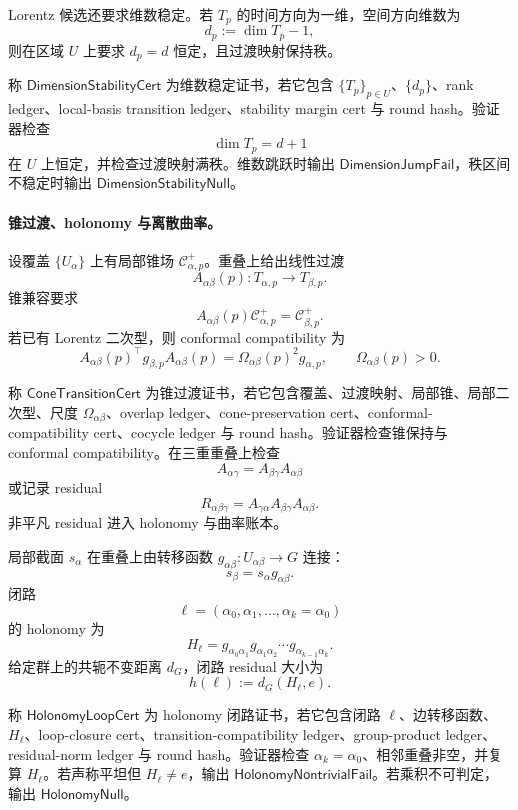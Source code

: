 Lorentz 候选还要求维数稳定。若 \(T_p\) 的时间方向为一维，空间方向维数为
\[
d_p:=\dim T_p-1,
\]
则在区域 \(U\) 上要求 \(d_p=d\) 恒定，且过渡映射保持秩。

\begin{definition}[维数稳定证书]\label{def:typed-address-biaxial-completion-dimension-stability-cert}
称 \(\mathsf{DimensionStabilityCert}\) 为维数稳定证书，若它包含 \(\{T_p\}_{p\in U}\)、\(\{d_p\}\)、rank ledger、local-basis transition ledger、stability margin cert 与 round hash。验证器检查
\[
\dim T_p=d+1
\]
在 \(U\) 上恒定，并检查过渡映射满秩。维数跳跃时输出 \(\mathsf{DimensionJumpFail}\)，秩区间不稳定时输出 \(\mathsf{DimensionStabilityNull}\)。
\end{definition}

\paragraph{锥过渡、holonomy 与离散曲率。}
设覆盖 \(\{U_\alpha\}\) 上有局部锥场 \(\mathcal C_{\alpha,p}^+\)。重叠上给出线性过渡
\[
A_{\alpha\beta}(p):T_{\alpha,p}\to T_{\beta,p}.
\]
锥兼容要求
\[
\boxed{
A_{\alpha\beta}(p)\mathcal C_{\alpha,p}^+
=
\mathcal C_{\beta,p}^+.
}
\]
若已有 Lorentz 二次型，则 conformal compatibility 为
\[
\boxed{
A_{\alpha\beta}(p)^\top g_{\beta,p}A_{\alpha\beta}(p)
=
\Omega_{\alpha\beta}(p)^2g_{\alpha,p},
\qquad
\Omega_{\alpha\beta}(p)>0.
}
\]

\begin{definition}[锥过渡证书]\label{def:typed-address-biaxial-completion-cone-transition-cert}
称 \(\mathsf{ConeTransitionCert}\) 为锥过渡证书，若它包含覆盖、过渡映射、局部锥、局部二次型、尺度 \(\Omega_{\alpha\beta}\)、overlap ledger、cone-preservation cert、conformal-compatibility cert、cocycle ledger 与 round hash。验证器检查锥保持与 conformal compatibility。在三重重叠上检查
\[
A_{\alpha\gamma}=A_{\beta\gamma}A_{\alpha\beta}
\]
或记录 residual
\[
R_{\alpha\beta\gamma}
=
A_{\gamma\alpha}A_{\beta\gamma}A_{\alpha\beta}.
\]
非平凡 residual 进入 holonomy 与曲率账本。
\end{definition}

局部截面 \(s_\alpha\) 在重叠上由转移函数 \(g_{\alpha\beta}:U_{\alpha\beta}\to G\) 连接：
\[
s_\beta=s_\alpha g_{\alpha\beta}.
\]
闭路
\[
\ell=(\alpha_0,\alpha_1,\ldots,\alpha_k=\alpha_0)
\]
的 holonomy 为
\[
\boxed{
H_\ell
=
g_{\alpha_0\alpha_1}
g_{\alpha_1\alpha_2}
\cdots
g_{\alpha_{k-1}\alpha_k}.
}
\]
给定群上的共轭不变距离 \(d_G\)，闭路 residual 大小为
\[
h(\ell):=d_G(H_\ell,e).
\]

\begin{definition}\label{def:typed-address-biaxial-completion-holonomy-loop-cert}
称 \(\mathsf{HolonomyLoopCert}\) 为 holonomy 闭路证书，若它包含闭路 \(\ell\)、边转移函数、\(H_\ell\)、loop-closure cert、transition-compatibility ledger、group-product ledger、residual-norm ledger 与 round hash。验证器检查 \(\alpha_k=\alpha_0\)、相邻重叠非空，并复算 \(H_\ell\)。若声称平坦但 \(H_\ell\neq e\)，输出 \(\mathsf{HolonomyNontrivialFail}\)。若乘积不可判定，输出 \(\mathsf{HolonomyNull}\)。
\end{definition}

